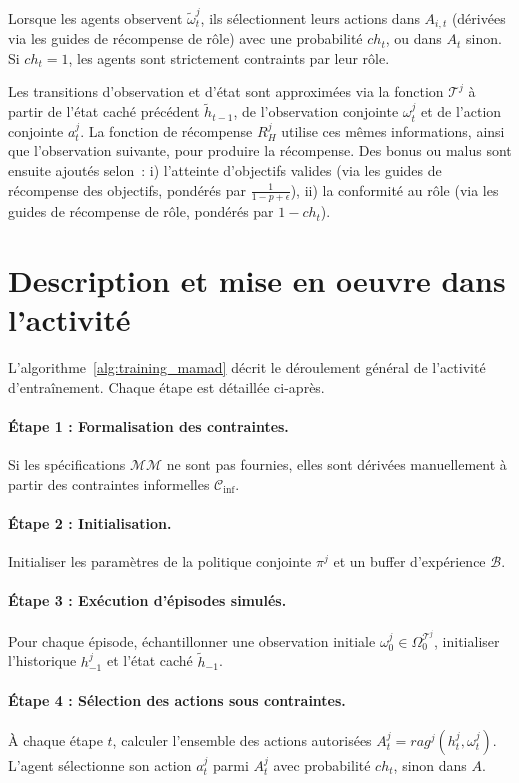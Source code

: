 Lorsque les agents observent $\tilde{\omega}_t^j$, ils sélectionnent leurs actions dans $A_{i,t}$ (dérivées via les guides de récompense de rôle) avec une probabilité $ch_t$, ou dans $A_t$ sinon. Si $ch_t = 1$, les agents sont strictement contraints par leur rôle.

Les transitions d'observation et d'état sont approximées via la fonction $\mathcal{T}^j$ à partir de l'état caché précédent $\tilde{h}_{t-1}$, de l'observation conjointe $\omega^j_t$ et de l'action conjointe $a^j_t$. La fonction de récompense $R^j_H$ utilise ces mêmes informations, ainsi que l'observation suivante, pour produire la récompense. Des bonus ou malus sont ensuite ajoutés selon~:
i) l'atteinte d'objectifs valides (via les guides de récompense des objectifs, pondérés par $\frac{1}{1 - p + \epsilon}$),
ii) la conformité au rôle (via les guides de récompense de rôle, pondérés par $1 - ch_t$).


\section{Description et mise en oeuvre dans l'activité}

L’algorithme~\ref{alg:training_mamad} décrit le déroulement général de l’activité d’entraînement.
Chaque étape est détaillée ci-après.

\paragraph{Étape 1 : Formalisation des contraintes.}
Si les spécifications $\mathcal{MM}$ ne sont pas fournies, elles sont dérivées manuellement à partir des contraintes informelles $\mathcal{C}_{\text{inf}}$.

\paragraph{Étape 2 : Initialisation.}
Initialiser les paramètres de la politique conjointe $\pi^j$ et un buffer d’expérience $\mathcal{B}$.

\paragraph{Étape 3 : Exécution d’épisodes simulés.}
Pour chaque épisode, échantillonner une observation initiale $\omega_0^j \in \Omega^{\mathcal{T}^j}_0$, initialiser l’historique $h_{-1}^j$ et l’état caché $\tilde{h}_{-1}$.

\paragraph{Étape 4 : Sélection des actions sous contraintes.}
À chaque étape $t$, calculer l’ensemble des actions autorisées $A_t^j = rag^j(h^j_t,\omega_t^j)$.
L’agent sélectionne son action $a_t^j$ parmi $A_t^j$ avec probabilité $ch_t$, sinon dans $A$.

